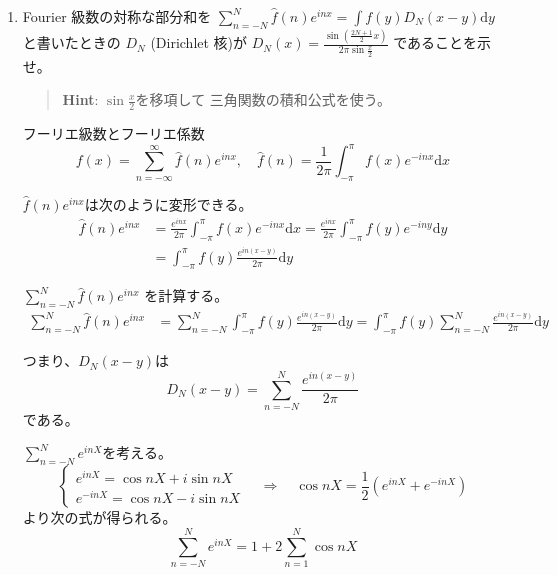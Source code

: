 \documentclass[12pt,b5paper]{ltjsarticle}
\begin{document}
\begin{enumerate}
      \hrulefill

 \item
      Fourier 級数の対称な部分和を
      $\displaystyle \sum_{n=-N}^{N}\widehat{f}(n)e^{inx}
       = \int f(y) D_{N}(x-y)\mathrm{d}y$
      と書いたときの
      $D_{N}$ (Dirichlet 核)が
      $\displaystyle D_{N}(x) =
       \frac{\sin\left(\frac{2N+1}{2}x\right)}{2\pi\sin\frac{x}{2}}$
      であることを示せ。
      \begin{quotation}
       \textbf{Hint}:
       $\sin\frac{x}{2}$を移項して
       三角関数の積和公式を使う。
      \end{quotation}

      \dotfill


      フーリエ級数とフーリエ係数
      \begin{equation}
       f(x)
        = \sum_{n=-\infty}^{\infty} \widehat{f}(n)e^{inx},\quad
       \widehat{f}(n)
        = \frac{1}{2\pi} \int_{-\pi}^{\pi} f(x)e^{-inx} \mathrm{d}x
      \end{equation}

      $\widehat{f}(n)e^{inx}$は次のように変形できる。
      \begin{align}
       \widehat{f}(n)e^{inx}
       &= \frac{e^{inx}}{2\pi} \int_{-\pi}^{\pi} f(x)e^{-inx} \mathrm{d}x
       = \frac{e^{inx}}{2\pi} \int_{-\pi}^{\pi} f(y)e^{-iny} \mathrm{d}y\\
       &= \int_{-\pi}^{\pi} f(y)\frac{e^{in(x-y)}}{2\pi} \mathrm{d}y
      \end{align}

      $\displaystyle \sum_{n=-N}^{N}\widehat{f}(n)e^{inx}$
      を計算する。
      \begin{align}
       \sum_{n=-N}^{N}\widehat{f}(n)e^{inx}
       &= \sum_{n=-N}^{N} \int_{-\pi}^{\pi} f(y)\frac{e^{in(x-y)}}{2\pi} \mathrm{d}y
       = \int_{-\pi}^{\pi} f(y) \sum_{n=-N}^{N} \frac{e^{in(x-y)}}{2\pi} \mathrm{d}y
      \end{align}

      つまり、$D_{N}(x-y)$は
      \begin{equation}
       D_{N}(x-y)
        = \sum_{n=-N}^{N} \frac{e^{in(x-y)}}{2\pi}
        \label{eq:Dn}
      \end{equation}
      である。

      $\sum_{n=-N}^{N} e^{inX}$を考える。
      \begin{equation}
       \begin{cases}
        e^{inX}=\cos{nX}+i\sin{nX}\\
        e^{-inX}=\cos{nX}-i\sin{nX}
       \end{cases}
        \quad \Rightarrow \quad
        \cos{nX}= \frac{1}{2}\left( e^{inX}+e^{-inX} \right)
      \end{equation}
      より次の式が得られる。
      \begin{equation}
       \sum_{n=-N}^{N} e^{inX}
        = 1+ 2\sum_{n=1}^{N} \cos{nX}
        \label{eq:sumexp}
      \end{equation}


\end{enumerate}
\end{document}
